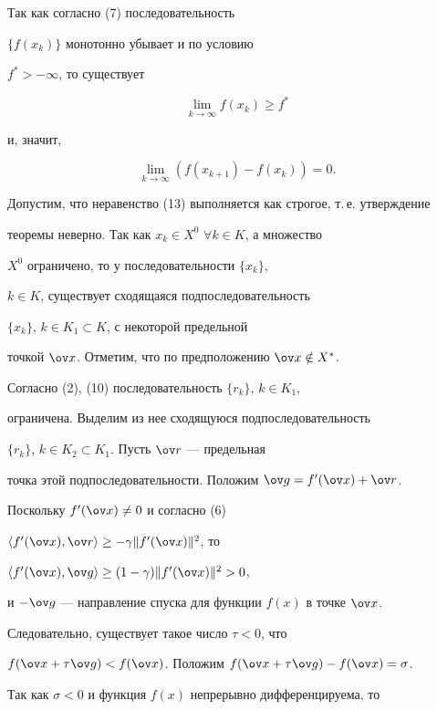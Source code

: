 \begin{pf} Так как согласно (7) последовательность 


$\{f(x_k)\}$ монотонно убывает и по условию


$f^*>-\infty$, то существует


\begin{equation}


\lim_{k\to \infty}f(x_k)\geq f^{*}


\end{equation}


и, значит,


\begin{equation}


\lim_{k\to \infty}(f(x_{k+1})-f(x_k))=0.


\end{equation}


Допустим, что неравенство (13) выполняется как строгое, т.\,е.{} утверждение


теоремы неверно. Так как $x_k\in X^0$ $\forall k\in K$, а множество


$X^0$ ограничено, то у последовательности $\{x_k\}$,


$k\in K$, существует сходящаяся подпоследовательность 


$\{x_k\}$, $k\in K_1\subset K$, с некоторой предельной


точкой $\ov x$. Отметим, что по предположению $\ov x\notin X^*$.


Согласно (2), (10) последовательность $\{r_k\}$, $k\in K_1$,


ограничена. Выделим из нее сходящуюся подпоследовательность 


$\{r_k\}$, $k\in K_2\subset K_1$. Пусть $\ov r$ --- предельная


точка этой подпоследовательности. Положим $\ov g=f'(\ov x)+\ov r$.


Поскольку $f'(\ov x)\neq 0$ и согласно (6)\;


$\langle f'(\ov x),\ov r\rangle \geq -\gamma \|f'(\ov x)\|^2$, то


$\langle f'(\ov x),\ov g\rangle \geq (1-\gamma )\|f'(\ov x)\|^2>0$,


и $-\ov g$ --- направление спуска для функции $f(x)$ в точке $\ov x$.


Следовательно, существует такое число $\tau <0$, что


$f(\ov x+\tau \ov g)<f(\ov x)$. Положим $f(\ov x+\tau\ov g)-f(\ov x)=\sigma$.


Так как $\sigma<0$ и функция $f(x)$ непрерывно дифференцируема, то 



\end{pf}
